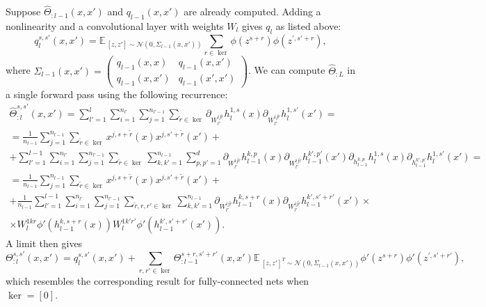 \documentclass{article}
\newcommand{\EE}{\mathbb{E}\,}
\newcommand{\NN}{\mathcal{N}}
\begin{document}
    Suppose $\hat\Theta_{:l-1}(x,x')$ and $q_{l-1}(x,x')$ are already computed.
    Adding a nonlinearity and a convolutional layer with weights $W_l$ gives $q_l$ as listed above:
    \begin{equation}
        q_l^{s,s'}(x,x') 
        = \EE_{[z,z'] \sim \NN(0,\Sigma_{l-1}(x,x'))} \sum_{r \in \ker} \phi(z^{s+r}) \phi(z^{\prime,s'+r}),
        \label{eq:q_iteration_conv}
    \end{equation}
    where $\Sigma_{l-1}(x,x') = \begin{pmatrix} q_{l-1}(x,x) & q_{l-1}(x,x')\\q_{l-1}(x,x') & q_{l-1}(x',x') \end{pmatrix}$.
    We can compute $\hat\Theta_{:L}$ in a single forward pass using the following recurrence:
    \begin{multline}
        \hat\Theta_{:l}^{s,s'}(x,x') 
        = \sum_{l'=1}^l \sum_{i=1}^{n_{l'}} \sum_{j=1}^{n_{l'-1}} \sum_{\tilde r \in \ker} \partial_{W_{l'}^{ij\tilde r}} h_l^{1,s}(x) \partial_{W_{l'}^{ij\tilde r}} h_l^{1,s'}(x')
        =\\= \frac{1}{n_{l-1}} \sum_{j=1}^{n_{l-1}} \sum_{\tilde r \in \ker} x^{j,s+\tilde r}(x) x^{j,s'+\tilde r}(x')
        +\\+ \sum_{l'=1}^{l-1} \sum_{i=1}^{n_{l'}} \sum_{j=1}^{n_{l'-1}} \sum_{\tilde r \in \ker} \sum_{k,k'=1}^{n_{l-1}} \sum_{p,p'=1}^d \partial_{W_{l'}^{ij\tilde r}} h_{l-1}^{k,p}(x) \partial_{W_{l'}^{ij\tilde r}} h_{l-1}^{k',p'}(x') \partial_{h_{l-1}^{k,p}} h_l^{1,s}(x) \partial_{h_{l-1}^{k',p'}} h_l^{1,s'}(x')
        =\\= \frac{1}{n_{l-1}} \sum_{j=1}^{n_{l-1}} \sum_{\tilde r \in \ker} x^{j,s+\tilde r}(x) x^{j,s'+\tilde r}(x')
        +\\+ \frac{1}{n_{l-1}} \sum_{l'=1}^{l-1} \sum_{i=1}^{n_{l'}} \sum_{j=1}^{n_{l'-1}} \sum_{\tilde r,r,r' \in \ker} \sum_{k,k'=1}^{n_{l-1}} \partial_{W_{l'}^{ij\tilde r}} h_{l-1}^{k,s+r}(x) \partial_{W_{l'}^{ij\tilde r}} h_{l-1}^{k',s'+r'}(x') \times\\\times W_l^{1kr} \phi'(h_{l-1}^{k,s+r}(x)) W_l^{1k'r'} \phi'(h_{l-1}^{k',s'+r'}(x')).
        \label{eq:Theta_iteration_conv}
    \end{multline}
    A limit then gives
    \begin{equation}
        \Theta_{:l}^{s,s'}(x,x') 
        = q_l^{s,s'}(x,x') + \sum_{r,r' \in \ker} \Theta_{:l-1}^{s+r,s'+r'}(x,x') \EE_{[z,z']^T \sim \NN(0,\Sigma_{l-1}(x,x'))} \phi'(z^{s+r}) \phi'(z^{\prime,s'+r'}),
    \end{equation}
    which resembles the corresponding result for fully-connected nets when $\ker = [0]$.
\end{document}
